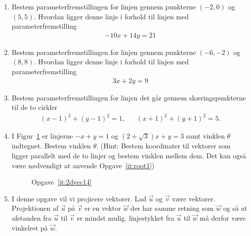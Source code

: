 \begin{enumerate}
	
	
	
	\item Bestem parameterfremstillingen for linjen gennem punkterne $(-2,0)$ og $(5,5)$. Hvordan ligger denne linje i forhold til linjen med parameterfremstilling
	\begin{align*}
	-10x+14y=21
	\end{align*}
	
		
	\item Bestem parameterfremstillingen for linjen gennem punkterne  $(-6,-2)$ og $(8,8)$. Hvordan ligger denne linje i forhold til linjen med parameterfremstilling
	\begin{align*}
	3x+2y=9
	\end{align*}
	
	
	\item Bestem parameterfremstillingen for linjen det går gennem skæringspunkterne til de to cirkler 
	\begin{align*}
	(x-1)^2+(y-1)^2=1,&& (x+1)^2+(y+1)^2=5.
	\end{align*}
	
			\item\label{it:2dvec14} I Figur~\ref{fig:2dvec14} er linjerne $-x+y=1$ og $(2+\sqrt{3})x+y=3$ samt vinklen $\theta$ indtegnet. Bestem vinklen $\theta$. (Hint: Bestem koordinater til vektorer som ligger parallelt med de to linjer og bestem vinklen mellem dem. Det kan også være nødvendigt at anvende Opgave~\ref{it:root1})
	
	\begin{figure}
		\centering
		\caption{Opgave~\ref{it:2dvec14}}
		\label{fig:2dvec14}
	\end{figure}
	
	
	\item\label{it:2dvec15} I denne opgave vil vi projicere vektorer. Lad $\vec{u}$ og $\vec{v}$ være vektorer. Projektionen af $\vec{u}$ på $\vec{v}$ er en vektor $\vec{w}$ der har samme retning som $\vec{w}$ og så at afstanden fra $\vec{u}$ til $\vec{v}$ er mindst mulig. linjestykket fra $\vec{u}$ til $\vec{w}$ må derfor være vinkelret på $\vec{w}$.
	

\end{enumerate}
